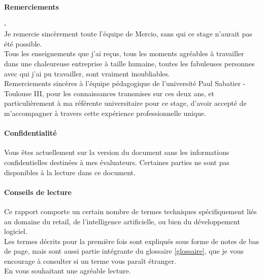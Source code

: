 \documentclass{rapportCS}
\begin{document}
\begin{center}
\begin{abstract}
	\end{abstract}
\end{center}

\newpage
	
\begin{center}
\huge{\textbf{Remerciements} \\}

\normalsize{} - \\
  Je remercie sincèrement toute l'équipe de Mercio, sans qui ce stage n'aurait pas été possible.\\
Tous les enseignements que j'ai reçus, tous les moments agréables à travailler dans une chaleureuse
entreprise à taille humaine, toutes les fabuleuses personnes avec qui j'ai pu travailler, sont vraiment
inoubliables.\\

Remerciements sincères à l'équipe pédagogique de l'université Paul Sabatier - Toulouse III, pour 
les connaissances transmises sur ces deux ans, et particulièrement à ma référente universitaire pour ce stage, 
d'avoir accepté de m'accompagner à travers cette expérience professionnelle unique.

\end{center}

\newpage


\paragraph{Confidentialité}
Vous êtes actuellement sur la version du document sans les informations confidentielles
destinées à mes évaluateurs. Certaines parties ne sont pas disponibles à la lecture
dans ce document.

\paragraph{Conseils de lecture}
Ce rapport comporte un certain nombre de termes techniques spécifiquement liés au domaine du retail,
de l'intelligence artificielle, ou bien du développement logiciel.\\ 
Les termes décrits pour la première fois sont expliqués sous forme de notes de bas de page,
mais sont aussi partie intégrante du glossaire \ref{glossaire}, que je vous encourage
à consulter si un terme vous paraît étranger.\\
En vous souhaitant une agréable lecture.\\
\end{document}
